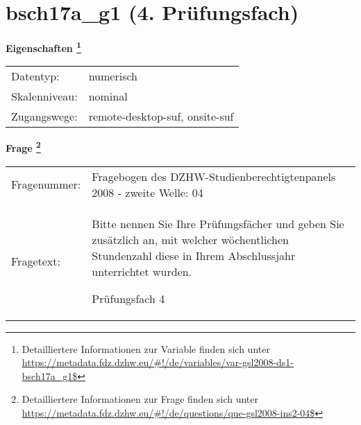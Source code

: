 
    \setcounter{footnote}{0}

    \vspace*{-1.8cm}
	\section{bsch17a\_g1 (4. Prüfungsfach)}
	\label{section:bsch17a_g1}



    \vspace*{0.5cm}
    \noindent\textbf{Eigenschaften
	\footnote{Detailliertere Informationen zur Variable finden sich unter
		\url{https://metadata.fdz.dzhw.eu/\#!/de/variables/var-gsl2008-ds1-bsch17a_g1$}}}\\
	\begin{tabularx}{\hsize}{@{}lX}
	Datentyp: & numerisch \\
	Skalenniveau: & nominal \\
	Zugangswege: &
	  remote-desktop-suf, 
	  onsite-suf
 \\
    \end{tabularx}



				\vspace*{0.5cm}
                \noindent\textbf{Frage
	                \footnote{Detailliertere Informationen zur Frage finden sich unter
		              \url{https://metadata.fdz.dzhw.eu/\#!/de/questions/que-gsl2008-ins2-04$}}}\\
				\begin{tabularx}{\hsize}{@{}lX}
					Fragenummer: &
					  Fragebogen des DZHW-Studienberechtigtenpanels 2008 - zweite Welle:
					  04
 \\
					Fragetext: & Bitte nennen Sie Ihre Prüfungsfächer und geben Sie zusätzlich an, mit welcher wöchentlichen Stundenzahl diese in Ihrem Abschlussjahr unterrichtet wurden.\par  Prüfungsfach 4 \\
				\end{tabularx}





